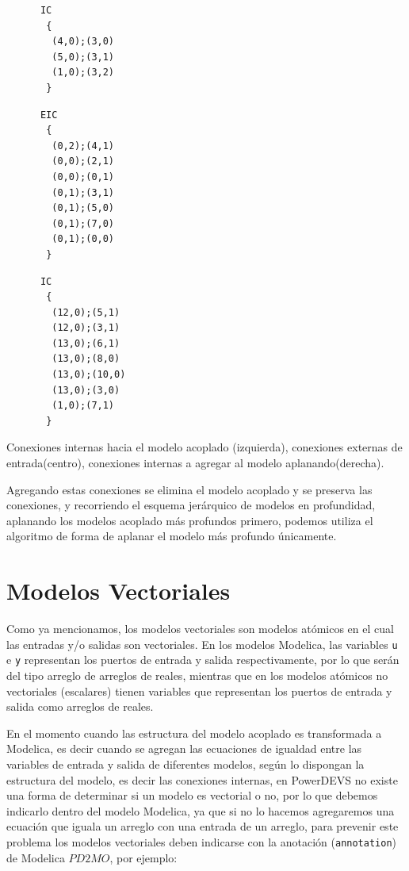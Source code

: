 \begin{itemize}
\begin{listing}
\begin{minipage}[t]{0.3\linewidth}
\begin{verbatim}
      IC
       {
        (4,0);(3,0)
        (5,0);(3,1)
        (1,0);(3,2)
       }
\end{verbatim}
\end{minipage}
\begin{minipage}[t]{0.3\linewidth}
\begin{verbatim}
      EIC
       {
        (0,2);(4,1)
        (0,0);(2,1)
        (0,0);(0,1)
        (0,1);(3,1)
        (0,1);(5,0)
        (0,1);(7,0)
        (0,1);(0,0)
       }
\end{verbatim}
\end{minipage}
\begin{minipage}[t]{0.3\linewidth}
\begin{verbatim}
      IC
       {
        (12,0);(5,1)
        (12,0);(3,1)
        (13,0);(6,1)
        (13,0);(8,0)
        (13,0);(10,0)
        (13,0);(3,0)
        (1,0);(7,1)
       }
\end{verbatim}
\end{minipage}
\label{lst:conexiones3}
\caption{Conexiones internas hacia el modelo acoplado (izquierda), conexiones externas de entrada(centro), conexiones internas a agregar al modelo aplanando(derecha).}
\end{listing}
\end{itemize}

	Agregando estas conexiones se elimina el modelo acoplado y se preserva las conexiones, y recorriendo el esquema jerárquico de modelos en profundidad, 
	aplanando los modelos acoplado más profundos primero, podemos utiliza el algoritmo de forma de aplanar el modelo más profundo únicamente.

\section{Modelos Vectoriales}
	Como ya mencionamos, los modelos vectoriales son modelos atómicos en el cual las entradas y/o salidas son vectoriales. En los modelos Modelica, 
	las variables \texttt{u} e \texttt{y} representan los puertos de entrada y salida respectivamente, por lo que serán del tipo arreglo de arreglos de reales,
	mientras que en los modelos atómicos no vectoriales (escalares) tienen variables que representan los puertos de entrada y salida como arreglos de reales. 

	En el momento cuando las estructura del modelo acoplado es transformada a Modelica, es decir cuando se agregan las ecuaciones de igualdad entre las
	variables de entrada y salida de diferentes modelos, según lo dispongan la estructura del modelo, es decir las conexiones internas, en PowerDEVS 
	no existe una forma de determinar si un modelo es vectorial o no, por lo que debemos indicarlo dentro del modelo Modelica, ya que si no lo hacemos 
	agregaremos una ecuación que iguala un arreglo con una entrada de un arreglo, para prevenir este problema los modelos vectoriales deben indicarse 
	con la anotación (\texttt{annotation}) de Modelica $PD2MO$, por ejemplo:

